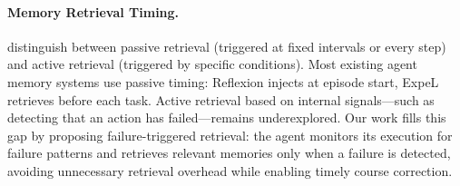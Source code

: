 \paragraph{Memory Retrieval Timing.}
\citet{liu2025memory} distinguish between passive retrieval (triggered at fixed intervals or every step) and active retrieval (triggered by specific conditions). Most existing agent memory systems use passive timing: Reflexion injects at episode start, ExpeL retrieves before each task. Active retrieval based on internal signals---such as detecting that an action has failed---remains underexplored. Our work fills this gap by proposing failure-triggered retrieval: the agent monitors its execution for failure patterns and retrieves relevant memories only when a failure is detected, avoiding unnecessary retrieval overhead while enabling timely course correction.
